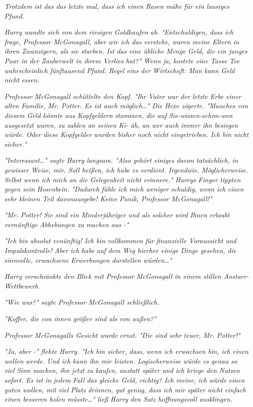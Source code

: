 {\emph{\emph{Trotzdem ist das das letzte mal, dass ich einen Rasen mähe für ein lausiges Pfund.}}

\emph{Harry wandte sich von dem riesigen Goldhaufen ab. "Entschuldigen, dass ich frage, Professor McGonagall, aber wie ich das verstehe, waren meine Eltern in ihren Zwanzigern, als sie starben. Ist das eine übliche Menge Geld, die ein junges Paar in der Zauberwelt in ihrem Verlies hat?" Wenn ja, kostete eine Tasse Tee wahrscheinlich fünftausend Pfund. Regel eins der Wirtschaft: Man kann Geld nicht essen.}

\emph{Professor McGonagall schüttelte den Kopf. "Ihr Vater war der letzte Erbe einer alten Familie, Mr. Potter. Es ist auch möglich…" Die Hexe zögerte. "Manches von diesem Geld könnte aus Kopfgeldern stammen, die auf Sie-wissen-schon-wen ausgesetzt waren, zu zahlen an seinen Ki- äh, an wer auch immer ihn besiegen würde. Oder diese Kopfgelder wurden bisher noch nicht eingetrieben. Ich bin nicht sicher."}

\emph{"Interessant…" sagte Harry langsam. "Also gehört einiges davon tatsächlich, in gewisser Weise, mir. Soll heißen, ich habe es verdient. Irgendwie. Möglicherweise. Selbst wenn ich mich an die Gelegenheit nicht erinnere." Harrys Finger tippten gegen sein Hosenbein. "Dadurch fühle ich mich weniger schuldig, wenn ich} \emph{\emph{einen sehr kleinen Teil davon}\emph{ausgebe! Keine Panik, Professor McGonagall!}"}

\emph{"Mr. Potter! Sie sind ein Minderjähriger und als solcher wird Ihnen erlaubt} \emph{\emph{vernünftige}} \emph{Abhebungen zu machen aus -"}

\emph{"Ich bin} \emph{\emph{absolut}} \emph{venünftig! Ich bin vollkommen für finanzielle Voraussicht und Impulskontrolle! Aber ich} \emph{\emph{habe}} \emph{auf dem Weg hierher einige Dinge gesehen, die} \emph{\emph{sinnvolle, erwachsene}} \emph{Erwerbungen darstellen würden…"}

\emph{Harry verschränkte den Blick mit Professor McGonagall in einem stillen Anstarr-Wettbewerb.}

\emph{"Wie was?" sagte Professor McGonagall schließlich.}

\emph{"Koffer, die von innen größer sind als von außen?"}

\emph{Professor McGonagalls Gesicht wurde ernst. "Die sind} \emph{\emph{sehr}} \emph{teuer, Mr. Potter!"}

\emph{"Ja, aber -" flehte Harry. "Ich bin sicher, dass, wenn ich erwachsen bin, ich} \emph{einen wollen werde. Und ich} \emph{\emph{kann}} \emph{ihn mir leisten. Logischerweise würde es genau so viel Sinn machen, ihn jetzt zu kaufen, anstatt später und ich kriege den Nutzen sofort. Es ist in jedem Fall das gleiche Geld, richtig? Ich meine, ich} \emph{\emph{würde}} \emph{einen guten wollen, mit} \emph{\emph{viel}} \emph{Platz drinnen, gut genug, dass ich mir später nicht einfach einen besseren holen müsste…" ließ Harry den Satz hoffnungsvoll ausklingen.}

}
